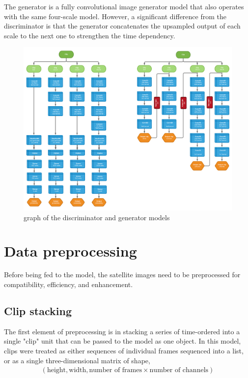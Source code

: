 \documentclass{article}
\begin{document}
The generator is a fully convolutional image generator model that also operates with the same four-scale model. However, a significant difference from the discriminator is that the generator concatenates the upsampled output of each scale to the next one to strengthen the time dependency.

\begin{figure}[H]
    \caption{graph of the discriminator and generator models}
    \centering
    \includegraphics[width=1.0\linewidth]{disc-gen-graph.png}
\end{figure}

\clearpage

\section{Data preprocessing}

Before being fed to the model, the satellite images need to be preprocessed for compatibility, efficiency, and enhancement.

\subsection{Clip stacking}

The first element of preprocessing is in stacking a series of time-ordered into a single "clip" unit that can be passed to the model as one object. In this model, clips were treated as either sequences of individual frames sequenced into a list, or as a single three-dimensional matrix of shape,
\begin{align*}
    (\textrm{height}, \textrm{width}, \textrm{number of frames}
    \times \textrm{number of channels})
\end{align*}
\end{document}
